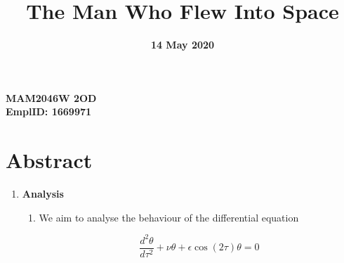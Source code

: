 \documentclass[12pt]{article}
\title{The Man Who Flew Into Space}
\date{\textbf{14 May 2020}}
\author{}
\begin{document}
    \maketitle
    \begin{center}
    \textbf{\large{MAM2046W 2OD}}\\
    \textbf{\large{EmplID: 1669971}}\\
    \end{center}

    \section{Abstract}

    \begin{enumerate}
        \item \textbf{Analysis} \newline
        \begin{enumerate}
            \item We aim to analyse the behaviour of the differential equation 
            
            \begin{equation}
                \frac{d^2\theta}{d\tau^2}+\nu \theta +\epsilon\cos(2\tau)\theta = 0
                \label{eqn:Main Differential Equation}
            \end{equation}


\end{enumerate}
\end{enumerate}
\end{document}
